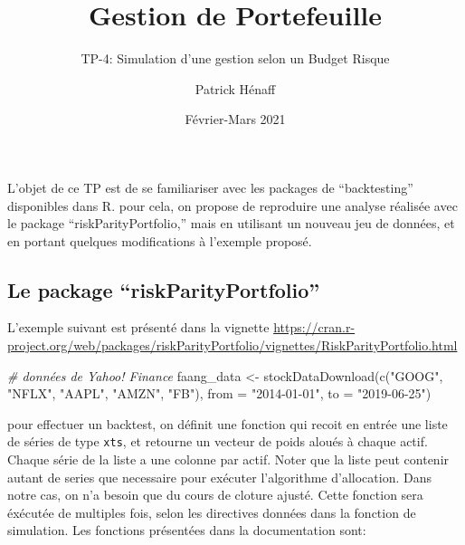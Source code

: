 \documentclass[
]{article}
\title{Gestion de Portefeuille}
\subtitle{TP-4: Simulation d'une gestion selon un Budget Risque}
\author{Patrick Hénaff}
\date{Février-Mars 2021}
\newenvironment{Shaded}{\begin{snugshade}}{\end{snugshade}}
\newcommand{\AttributeTok}[1]{\textcolor[rgb]{0.77,0.63,0.00}{#1}}
\newcommand{\CommentTok}[1]{\textcolor[rgb]{0.56,0.35,0.01}{\textit{#1}}}
\newcommand{\ControlFlowTok}[1]{\textcolor[rgb]{0.13,0.29,0.53}{\textbf{#1}}}
\newcommand{\DecValTok}[1]{\textcolor[rgb]{0.00,0.00,0.81}{#1}}
\newcommand{\FunctionTok}[1]{\textcolor[rgb]{0.00,0.00,0.00}{#1}}
\newcommand{\NormalTok}[1]{#1}
\newcommand{\OtherTok}[1]{\textcolor[rgb]{0.56,0.35,0.01}{#1}}
\newcommand{\SpecialCharTok}[1]{\textcolor[rgb]{0.00,0.00,0.00}{#1}}
\newcommand{\StringTok}[1]{\textcolor[rgb]{0.31,0.60,0.02}{#1}}
\begin{document}
\maketitle

L'objet de ce TP est de se familiariser avec les packages de
``backtesting'' disponibles dans R. pour cela, on propose de reproduire
une analyse réalisée avec le package ``riskParityPortfolio,'' mais en
utilisant un nouveau jeu de données, et en portant quelques
modifications à l'exemple proposé.

\hypertarget{le-package-riskparityportfolio}{%
\subsection{Le package
``riskParityPortfolio''}\label{le-package-riskparityportfolio}}

L'exemple suivant est présenté dans la vignette
\url{https://cran.r-project.org/web/packages/riskParityPortfolio/vignettes/RiskParityPortfolio.html}

\begin{Shaded}
\begin{Highlighting}[]
\CommentTok{\# données de Yahoo! Finance}
\NormalTok{faang\_data }\OtherTok{\textless{}{-}} \FunctionTok{stockDataDownload}\NormalTok{(}\FunctionTok{c}\NormalTok{(}\StringTok{"GOOG"}\NormalTok{, }\StringTok{"NFLX"}\NormalTok{, }\StringTok{"AAPL"}\NormalTok{, }\StringTok{"AMZN"}\NormalTok{, }\StringTok{"FB"}\NormalTok{),}
                                \AttributeTok{from =} \StringTok{"2014{-}01{-}01"}\NormalTok{, }\AttributeTok{to =} \StringTok{"2019{-}06{-}25"}\NormalTok{)}
\end{Highlighting}
\end{Shaded}

pour effectuer un backtest, on définit une fonction qui recoit en entrée
une liste de séries de type \texttt{xts}, et retourne un vecteur de
poids aloués à chaque actif. Chaque série de la liste a une colonne par
actif. Noter que la liste peut contenir autant de series que necessaire
pour exécuter l'algorithme d'allocation. Dans notre cas, on n'a besoin
que du cours de cloture ajusté. Cette fonction sera éxécutée de
multiples fois, selon les directives données dans la fonction de
simulation. Les fonctions présentées dans la documentation sont:

\begin{Shaded}
\end{Shaded}
\end{document}
